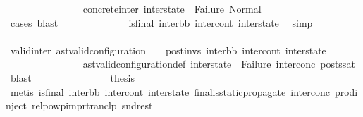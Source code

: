 \begin{isabellebody}
\ \ \ \ \ \ \ \ \ \ \ \ \ \ \isamarkupfalse%
\ concrete{\isacharunderscore}{\kern0pt}inter\ {\isacartoucheopen}inter{\isacharunderscore}{\kern0pt}state\ {\isasymnoteq}\ Failure{\isacartoucheclose}\ Normal\isanewline
\ \ \ \ \ \ \ \ \ \ \ \ \ \ \isamarkupfalse%
\ {\isacharparenleft}{\kern0pt}cases{\isacharparenright}{\kern0pt}\ blast{\isacharplus}{\kern0pt}\isanewline
\ \ \ \ \ \ \ \ \ \ \ \ \isamarkupfalse%
\ {\isachardoublequoteopen}is{\isacharunderscore}{\kern0pt}final\ {\isacharparenleft}{\kern0pt}inter{\isacharunderscore}{\kern0pt}bb{}{\isacharcomma}{\kern0pt}\ inter{\isacharunderscore}{\kern0pt}cont{}{\isacharcomma}{\kern0pt}\ inter{\isacharunderscore}{\kern0pt}state{}{\isacharparenright}{\kern0pt}{\isachardoublequoteclose}\ \isamarkupfalse%
\ simp\isanewline
\ \ \ \ \ \ \ \ \ \ \ \ \isamarkupfalse%
\ valid{\isacharunderscore}{\kern0pt}inter{\isacharcolon}{\kern0pt}\ {\isachardoublequoteopen}{\isacharparenleft}{\kern0pt}ast{\isacharunderscore}{\kern0pt}valid{\isacharunderscore}{\kern0pt}configuration\ {\isasymLambda}\ {\isasymGamma}\ {\isasymOmega}\ post{\isacharunderscore}{\kern0pt}invs\ inter{\isacharunderscore}{\kern0pt}bb{}\ inter{\isacharunderscore}{\kern0pt}cont{}\ inter{\isacharunderscore}{\kern0pt}state{}{\isacharparenright}{\kern0pt}{\isachardoublequoteclose}\ \isanewline
\ \ \ \ \ \ \ \ \ \ \ \ \ \ \isamarkupfalse%
\ ast{\isacharunderscore}{\kern0pt}valid{\isacharunderscore}{\kern0pt}configuration{\isacharunderscore}{\kern0pt}def\ {\isacartoucheopen}inter{\isacharunderscore}{\kern0pt}state\ {\isasymnoteq}\ Failure{\isacartoucheclose}\ inter{}{\isacharunderscore}{\kern0pt}conc\ posts{\isacharunderscore}{\kern0pt}sat\ \isamarkupfalse%
\ blast\isanewline
\ \ \ \ \ \ \ \ \ \ \ \ \isamarkupfalse%
\ \isamarkupfalse%
\ {\isacharquery}{\kern0pt}thesis\isanewline
\ \ \ \ \ \ \ \ \ \ \ \ \ \ \isamarkupfalse%
\ {\isacharparenleft}{\kern0pt}metis\ {\isacartoucheopen}is{\isacharunderscore}{\kern0pt}final\ {\isacharparenleft}{\kern0pt}inter{\isacharunderscore}{\kern0pt}bb{}{\isacharcomma}{\kern0pt}\ inter{\isacharunderscore}{\kern0pt}cont{}{\isacharcomma}{\kern0pt}\ inter{\isacharunderscore}{\kern0pt}state{}{\isacharparenright}{\kern0pt}{\isacartoucheclose}\ final{\isacharunderscore}{\kern0pt}is{\isacharunderscore}{\kern0pt}static{\isacharunderscore}{\kern0pt}propagate\ inter{}{\isacharunderscore}{\kern0pt}conc\ prod{\isachardot}{\kern0pt}inject\ relpowp{\isacharunderscore}{\kern0pt}imp{\isacharunderscore}{\kern0pt}rtranclp\ snd{\isacharunderscore}{\kern0pt}rest{\isacharparenright}{\kern0pt}\isanewline

\end{isabellebody}
